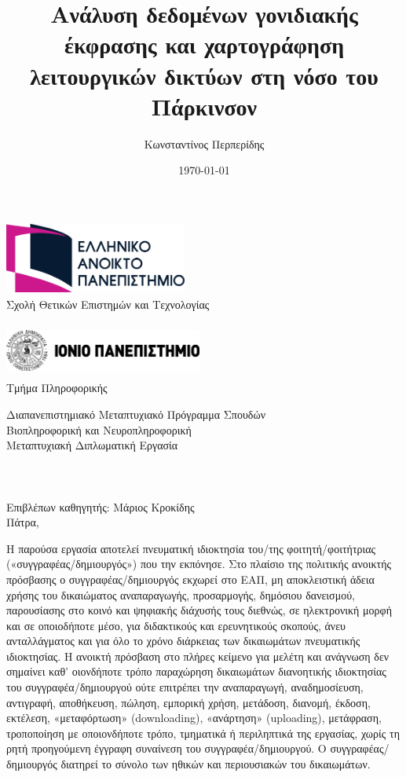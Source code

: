 \documentclass[12pt]{report}
\makeatletter
\newcommand{\frontmatter}{
    \cleardoublepage
    \pagenumbering{roman}
    \pagestyle{plain} %
    \setcounter{page}{1} %
}
\renewcommand{\maketitle}{
    \begin{titlepage}
        \noindent
        \begin{minipage}[t]{0.6\textwidth}
            \centering
            \includegraphics[height=2.4cm,width=6cm]{university1-logo.png}\\
            \fontsize{12pt}{14pt}\selectfont
            Σχολή Θετικών Επιστημών και Τεχνολογίας
        \end{minipage}
        \hfill
        \begin{minipage}[t]{0.4\textwidth}
            \centering
            \includegraphics[height=1.8cm,width=6.5cm]{university2-logo.png}\\
            \fontsize{12pt}{14pt}\selectfont
            Τμήμα Πληροφορικής
        \end{minipage}
        \vspace*{2cm}
        \begin{center}
            \fontsize{16pt}{14pt}\selectfont
            Διαπανεπιστημιακό Μεταπτυχιακό Πρόγραμμα Σπουδών\\[14pt]
            Βιοπληροφορική και Νευροπληροφορική\\[48pt]
            Μεταπτυχιακή Διπλωματική Εργασία\\[24pt]
    
            {\fontsize{16pt}{18pt}\selectfont\bfseries \@title\\[18pt]}
            {\large \@author\\[12pt]}\\[24pt]
            \fontsize{12pt}{14pt}\selectfont
            Επιβλέπων καθηγητής: Μάριος Κροκίδης\\
            \vspace{5cm}
            \fontsize{14pt}{16pt}\selectfont
            Πάτρα, {\large \@date}
        \end{center}
    \end{titlepage}
}
\makeatother
\begin{document}
\frontmatter

\title{Ανάλυση δεδομένων γονιδιακής έκφρασης και χαρτογράφηση λειτουργικών δικτύων στη νόσο του Πάρκινσον}
\author{Κωνσταντίνος Περπερίδης}
\date{\today}
\maketitle
\thispagestyle{empty} 
\cleardoublepage
\thispagestyle{empty} 
\vspace*{\fill} %
\begin{center}
\fontsize{10pt}{12pt}\selectfont
\textcopyright
Η παρούσα εργασία αποτελεί πνευματική ιδιοκτησία του/της φοιτητή/φοιτήτριας («συγγραφέας/δημιουργός»)
που την εκπόνησε. Στο πλαίσιο της πολιτικής ανοικτής πρόσβασης ο συγγραφέας/δημιουργός εκχωρεί στο
ΕΑΠ, μη αποκλειστική άδεια χρήσης του δικαιώματος αναπαραγωγής, προσαρμογής, δημόσιου δανεισμού,
παρουσίασης στο κοινό και ψηφιακής διάχυσής τους διεθνώς, σε ηλεκτρονική μορφή και σε οποιοδήποτε
μέσο, για διδακτικούς και ερευνητικούς σκοπούς, άνευ ανταλλάγματος και για όλο το χρόνο διάρκειας των
δικαιωμάτων πνευματικής ιδιοκτησίας. Η ανοικτή πρόσβαση στο πλήρες κείμενο για μελέτη και ανάγνωση
δεν σημαίνει καθ’ οιονδήποτε τρόπο παραχώρηση δικαιωμάτων διανοητικής ιδιοκτησίας του
συγγραφέα/δημιουργού ούτε επιτρέπει την αναπαραγωγή, αναδημοσίευση, αντιγραφή, αποθήκευση, πώληση,
εμπορική χρήση, μετάδοση, διανομή, έκδοση, εκτέλεση, «μεταφόρτωση» (downloading), «ανάρτηση»
(uploading), μετάφραση, τροποποίηση με οποιονδήποτε τρόπο, τμηματικά ή περιληπτικά της εργασίας, χωρίς
τη ρητή προηγούμενη έγγραφη συναίνεση του συγγραφέα/δημιουργού. Ο συγγραφέας/δημιουργός διατηρεί
το σύνολο των ηθικών και περιουσιακών του δικαιωμάτων.
\end{center}
\vspace*{\fill} %
\clearpage
\end{document}
